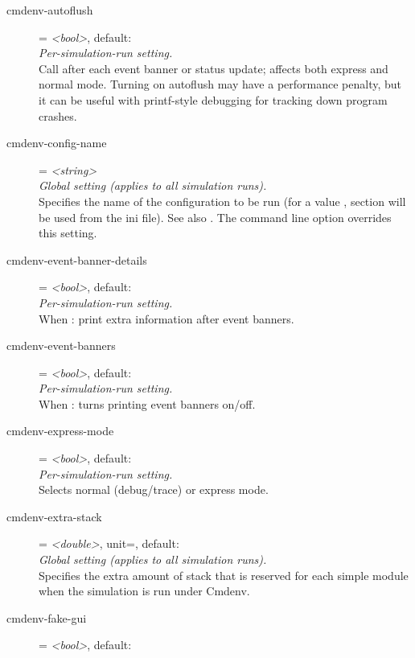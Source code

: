 \begin{description}
\item[cmdenv-autoflush] = \textit{<bool>}, default: \\
    \textit{Per-simulation-run setting.}\\
    Call  after each event banner or status update; affects
    both express and normal mode. Turning on autoflush may have a performance
    penalty, but it can be useful with printf-style debugging for tracking down
    program crashes.
\item[cmdenv-config-name] = \textit{<string>}\\
    \textit{Global setting (applies to all simulation runs).}\\
    Specifies the name of the configuration to be run (for a value ,
    section  will be used from the ini file).
    See also
    . The
     command line option overrides this setting.
\item[cmdenv-event-banner-details] = \textit{<bool>}, default: \\
    \textit{Per-simulation-run setting.}\\
    When
    :
    print extra information after event banners.
\item[cmdenv-event-banners] = \textit{<bool>}, default: \\
    \textit{Per-simulation-run setting.}\\
    When
    :
    turns printing event banners on/off.
\item[cmdenv-express-mode] = \textit{<bool>}, default: \\
    \textit{Per-simulation-run setting.}\\
    Selects normal (debug/trace) or express mode.
\item[cmdenv-extra-stack] = \textit{<double>}, unit=, default: \\
    \textit{Global setting (applies to all simulation runs).}\\
    Specifies the extra amount of stack that is reserved for each
     simple module when the simulation is run under Cmdenv.
\item[cmdenv-fake-gui] = \textit{<bool>}, default: \\

\end{description}
